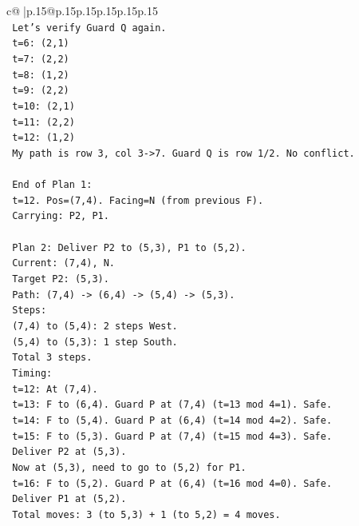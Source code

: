 \documentclass{article}
\begin{document}
{\begin{supertabular}{c@{$\;$}|p{.15\linewidth}@{}p{.15\linewidth}p{.15\linewidth}p{.15\linewidth}p{.15\linewidth}p{.15\linewidth}}
{{{\\ 
\texttt{   Let's verify Guard Q again.} \\
\texttt{   t=6: (2,1)} \\
\texttt{   t=7: (2,2)} \\
\texttt{   t=8: (1,2)} \\
\texttt{   t=9: (2,2)} \\
\texttt{   t=10: (2,1)} \\
\texttt{   t=11: (2,2)} \\
\texttt{   t=12: (1,2)} \\
\texttt{   My path is row 3, col 3{-}>7. Guard Q is row 1/2. No conflict.} \\
\\ 
\texttt{   End of Plan 1:} \\
\texttt{   t=12. Pos=(7,4). Facing=N (from previous F).} \\
\texttt{   Carrying: P2, P1.} \\
\\ 
\texttt{   Plan 2: Deliver P2 to (5,3), P1 to (5,2).} \\
\texttt{   Current: (7,4), N.} \\
\texttt{   Target P2: (5,3).} \\
\texttt{   Path: (7,4) {-}> (6,4) {-}> (5,4) {-}> (5,3).} \\
\texttt{   Steps:} \\
\texttt{   (7,4) to (5,4): 2 steps West.} \\
\texttt{   (5,4) to (5,3): 1 step South.} \\
\texttt{   Total 3 steps.} \\
\texttt{   Timing:} \\
\texttt{   t=12: At (7,4).} \\
\texttt{   t=13: F to (6,4). Guard P at (7,4) (t=13 mod 4=1). Safe.} \\
\texttt{   t=14: F to (5,4). Guard P at (6,4) (t=14 mod 4=2). Safe.} \\
\texttt{   t=15: F to (5,3). Guard P at (7,4) (t=15 mod 4=3). Safe.} \\
\texttt{   Deliver P2 at (5,3).} \\
\texttt{   Now at (5,3), need to go to (5,2) for P1.} \\
\texttt{   t=16: F to (5,2). Guard P at (6,4) (t=16 mod 4=0). Safe.} \\
\texttt{   Deliver P1 at (5,2).} \\
\texttt{   Total moves: 3 (to 5,3) + 1 (to 5,2) = 4 moves.} \\
}}}
\end{supertabular}}
\end{document}
